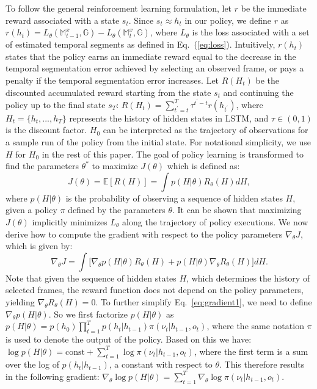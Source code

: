 \documentclass{bmvc2k}
\begin{document}
To follow the general reinforcement learning formulation, let $r$ be the immediate reward associated with a state $s_t$. Since $s_t \approx h_t$ in our policy, we define $r$ as $r(h_t) =  L_\theta(\mathbb{M}^x_{t-1}, \mathbb{G}) - L_\theta(\mathbb{M}^x_t, \mathbb{G})$, where $L_\theta$ is the loss associated with a set of estimated temporal segments as defined in Eq.~(\ref{eq:loss}). Intuitively, $r(h_t)$ states that the policy earns an immediate reward equal to the decrease in the temporal segmentation error achieved by selecting an observed frame, or pays a penalty if the temporal segmentation error increases. Let $R(H_t)$ be the discounted accumulated reward starting from the state $s_t$ and continuing the policy up to the final state $s_T$: $R(H_t) = \sum_{t^\prime = t}^T \tau^ {t^\prime - t} r(h_{t^\prime})$, where $H_t = \{h_t, ..., h_T\}$ represents the history of hidden states in LSTM, and $\tau\in(0,1)$ is the discount factor. $H_0$ can be interpreted as the trajectory of observations for a sample run of the policy from the initial state. For notational simplicity, we use $H$ for $H_0$ in the rest of this paper. The goal of policy learning is transformed to find the parameters $\theta^*$ to maximize $J(\theta)$ which is defined as:
\begin{equation}
\label{eq:acc_reward}
J(\theta) = \mathbb{E}[R(H)] = \int p(H|\theta) R_\theta(H) dH,
\end{equation}
\noindent where $p(H |\theta)$ is the probability of observing a sequence of hidden states $H$, given a policy $\pi$ defined by the parameters $\theta$. It can be shown that maximizing $J(\theta)$ implicitly minimizes $L_\theta$ along the trajectory of policy executions. We now derive how to compute the gradient with respect to the policy parameters $\nabla_{\theta}J$, which is given by: 
\begin{equation}
\label{eq:gradient1}
\nabla_{\theta}J = \int \big[\nabla_{\theta} p(H|\theta) R_\theta(H) + p(H|\theta) \nabla_{\theta} R_\theta(H)\big] dH.
\end{equation}
\noindent Note that given the sequence of hidden states $H$, which determines the history of selected frames, the reward function does not depend on the policy parameters, yielding $\nabla_{\theta} R_{\theta}(H) = 0$. To further simplify Eq.~\eqref{eq:gradient1}, we need to define $\nabla_{\theta} p(H|\theta)$. So we first factorize $p(H|\theta)$ as $p(H|\theta) = p(h_0) \prod_{t=1}^T p(h_t | h_{t-1}) \pi(\nu_t | h_{t-1}, o_t)$, where the same notation $\pi$ is used to denote the output of the policy. Based on this we have: $\log p(H|\theta) = \text{const} + \sum_{t=1}^T \log \pi(\nu_t | h_{t-1}, o_t)$, where the first term is a sum over the log of $p(h_t| h_{t-1})$, a constant with respect to $\theta$. This therefore results in the following gradient: $\nabla_{\theta} \log  p(H|\theta) = \sum_{t=1}^T \nabla_\theta \log \pi(\nu_t | h_{t-1}, o_t)$.
\end{document}
